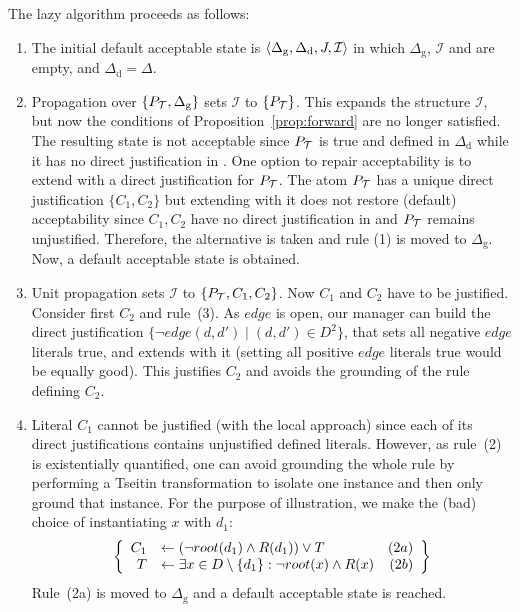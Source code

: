 \documentclass[11pt]{article}
\newcommand{\m}[1]{\ensuremath{#1}\xspace}
\newcommand{\lrule}{\m{\leftarrow}}
\newcommand{\I}{\m{\mathcal{I}}}
\newcommand{\theory}{\m{\mathcal{T}}}
\newcommand{\D}{\m{\Delta}}
\newcommand{\typed}[2]{\m{#1\in #2:}}
\newcommand{\tuple}[1]{\m{\left \langle #1 \right \rangle }}
\theoremstyle{plain}
\theoremstyle{definition}
\theoremstyle{example_basic}
\theoremstyle{example_contd}
\theoremstyle{plain}
\newcommand{\Dg}{\ensuremath{\D_\text{g}}\xspace}
\newcommand{\Dd}{\ensuremath{\D_\text{d}}\xspace}
\newcommand{\pt}{\ensuremath{P_\text{\theory}}\xspace}
\newcommand{\change}[1]{#1}
\begin{document}
The lazy \MX algorithm proceeds as follows:
\begin{enumerate}
\item The initial default acceptable state is
  $\tuple{\Dg,\Dd,\jgraph,\I}$ in which \Dg, \I and \jgraph are empty,
  and $\Dd=\D$.

\item Propagation over $\{\pt,\Dg\}$ sets $\I$ to $\{ \pt\}$.
  \change{This expands the structure \I, but now the conditions of
    Proposition~\ref{prop:forward} are no longer satisfied. The
    resulting state is not acceptable since \pt is true and defined in
    \Dd while it has no direct justification in \jgraph.  One option
    to repair acceptability is to extend \jgraph with a direct
    justification for \pt.  The  atom \pt has a unique direct
    justification $\{C_1,C_2\}$ but extending \jgraph with it does not
    restore (default) acceptability since $C_1, C_2$ have no direct
    justification in \jgraph and  \pt remains unjustified. Therefore,
    the alternative is taken and rule (1) is moved to \Dg. Now, a default acceptable state is obtained.}

\item \change{Unit propagation sets $\I$ to $\{ \pt, C_1, C_2\}$. Now $C_1$ and $C_2$ have to be justified. Consider first $C_2$ and rule~(3). As $edge$ is open, our manager can build the direct justification $\{ \neg edge(d,d') \mid (d,d')\in D^2\}$, that sets all negative $edge$ literals true, and extends \jgraph with it (setting all positive $edge$ literals true would be equally good). This justifies $C_2$ and avoids the grounding of the rule defining $C_2$.}

\item Literal $C_1$ cannot be justified (with the local approach) since each of its direct justifications contains unjustified defined literals. However, as rule~(2) is existentially quantified, one can avoid grounding the whole rule by performing a Tseitin transformation to isolate one instance and then only ground that instance. For the purpose of illustration, we make the (bad) choice of  instantiating $x$ with $d_1$:
  \[\left\{\begin{array}{rlr}
      C_1&\lrule(\lnot \rt(d_1) \land R(d_1)) \lor T & (2a)\\
      T&\lrule\exists \typed{x}{D\setminus \{d_1\}} \lnot\rt(x) \land R(x) &(2b)
    \end{array}\right\}\]
  Rule~(2a) is moved to $\Dg$ and a default acceptable state is reached.


\end{enumerate}
\end{document}
